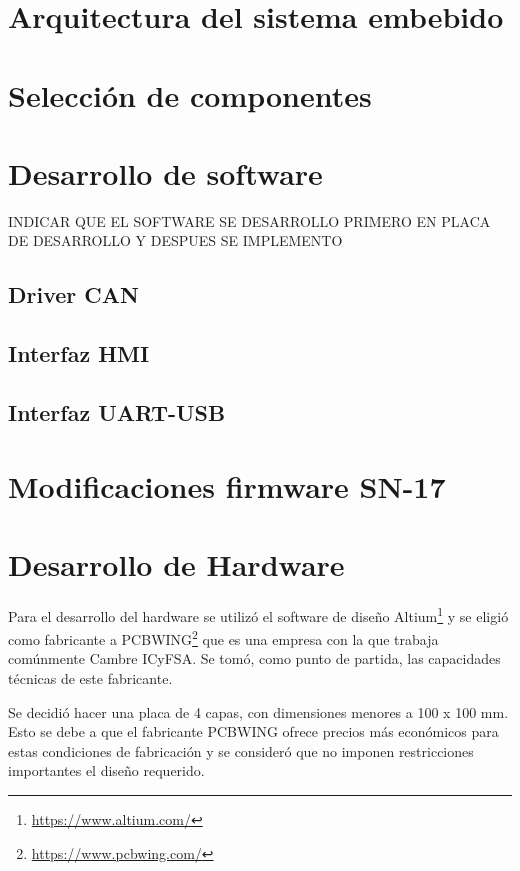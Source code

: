 \section{Arquitectura del sistema embebido}
 
\section{Selección de componentes}

\section{Desarrollo de software}

INDICAR QUE EL SOFTWARE SE DESARROLLO PRIMERO EN PLACA DE DESARROLLO Y DESPUES SE IMPLEMENTO

\subsection{Driver CAN}

\subsection{Interfaz HMI}

\subsection{Interfaz UART-USB}

\section{Modificaciones firmware SN-17}

\section{Desarrollo de Hardware}

Para el desarrollo del hardware se utilizó el software de diseño Altium\footnote{\url{https://www.altium.com/}} y se eligió como fabricante a PCBWING\footnote{\url{https://www.pcbwing.com/}} que es una empresa con la que trabaja comúnmente Cambre ICyFSA. Se tomó, como punto de partida, las capacidades técnicas de este fabricante.

Se decidió hacer una placa de 4 capas, con dimensiones menores a 100 x 100 mm. Esto se debe a que el fabricante PCBWING ofrece precios más económicos para estas condiciones de fabricación y se consideró que no imponen restricciones importantes el diseño requerido.


